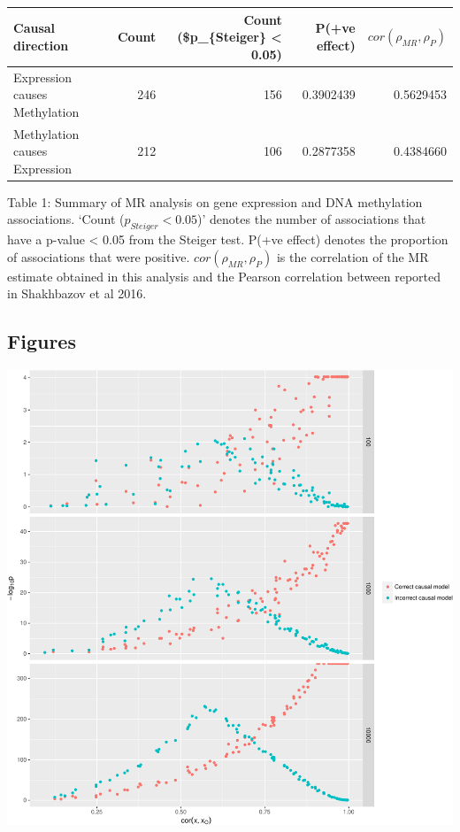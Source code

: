\documentclass[]{article}
\begin{document}
\begin{longtable}[c]{@{}lrrrr@{}}
\toprule
Causal direction & Count & Count (\$p\_\{Steiger\} \textless{} 0.05) &
P(+ve effect) & \(cor(\rho_{MR}, \rho_{P})\)\tabularnewline
\midrule
\endhead
Expression causes Methylation & 246 & 156 & 0.3902439 &
0.5629453\tabularnewline
Methylation causes Expression & 212 & 106 & 0.2877358 &
0.4384660\tabularnewline
\bottomrule
\end{longtable}

Table 1: Summary of MR analysis on gene expression and DNA methylation
associations. `Count (\(p_{Steiger} < 0.05\))' denotes the number of
associations that have a p-value \textless{} 0.05 from the Steiger test.
P(+ve effect) denotes the proportion of associations that were positive.
\(cor(\rho_{MR}, \rho_{P})\) is the correlation of the MR estimate
obtained in this analysis and the Pearson correlation between reported
in Shakhbazov et al 2016.

\newpage

\subsection{Figures}\label{figures}

\includegraphics{manuscript_files/figure-latex/cit_measurement_error_figure-1.pdf}
\end{document}
